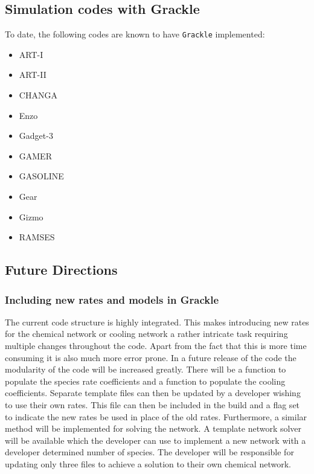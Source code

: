 \subsection{Simulation codes with Grackle}
To date, the following codes are known to have \texttt{Grackle}
implemented:
\begin{itemize}

\item ART-I \citep{1999PhDT........25K, 2002ApJ...571..563K}

\item ART-II \citep{2008ApJ...672...19R}

\item CHANGA \citep{2004NewA....9..137W, 2006MNRAS.373.1074S}

\item Enzo \citep{2014ApJS..211...19B}

\item Gadget-3 \citep{2005MNRAS.364.1105S}

\item GAMER \citep{2010ApJS..186..457S}

\item GASOLINE \citep{2004NewA....9..137W}

\item Gear \citep{2012A&A...538A..82R, 2012ASPC..453..141R}

\item Gizmo \citep{2015MNRAS.450...53H}

\item RAMSES \citep{2002A&A...385..337T}

\end{itemize}

\subsection{Future Directions} \label{Future_Directions}

\subsubsection{Including new rates and models in Grackle}
The current code structure is highly integrated. This makes introducing new rates for the 
chemical network or cooling network a rather intricate task requiring multiple changes throughout the code. 
Apart from the fact that this is more time consuming it is also much more error prone. In a future release of the 
code the modularity of the code will be increased greatly. There will be a function to populate the species 
rate coefficients and a function to populate the cooling coefficients. Separate template files can then be 
updated by a developer wishing to use their own rates. This file can then be included in the build and a flag
set to indicate the new rates be used in place of the old rates. Furthermore, a similar method will be 
implemented for solving the network. A template network solver will be available which the developer can use to 
implement a new network with a developer determined number of species. The developer will be responsible for
updating only three files to achieve a solution to their own chemical network. 

